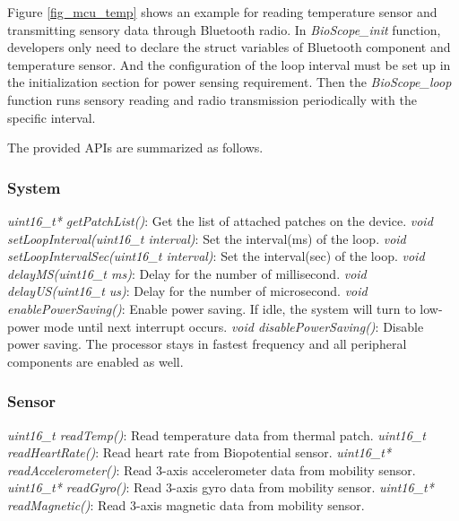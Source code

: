 Figure \ref{fig_mcu_temp} shows an example for reading temperature sensor and transmitting sensory data through Bluetooth radio.
In \textit{BioScope\_init} function, developers only need to declare the struct variables of Bluetooth component and temperature sensor. And the configuration of the loop interval must be set up in the initialization section for power sensing requirement.
Then the \textit{BioScope\_loop} function runs sensory reading and radio transmission periodically with the specific interval.

The provided APIs are summarized as follows.
\subsubsection{System}
\textit{uint16\_t* getPatchList()}: Get the list of attached patches on the device.
\vspace{10pt}
\newline
\textit{void setLoopInterval(uint16\_t interval)}: Set the interval(ms) of the loop.
\vspace{10pt}
\newline
\textit{void setLoopIntervalSec(uint16\_t interval)}: Set the interval(sec) of the loop.
\vspace{10pt}
\newline
\textit{void delayMS(uint16\_t ms)}: Delay for the number of millisecond.
\vspace{10pt}
\newline
\textit{void delayUS(uint16\_t us)}: Delay for the number of microsecond.
\vspace{10pt}
\newline
\textit{void enablePowerSaving()}: Enable power saving. If idle, the system will turn to low-power mode until next interrupt occurs.
\vspace{10pt}
\newline
\textit{void disablePowerSaving()}: Disable power saving. The processor stays in fastest frequency and all peripheral components are enabled as well.
\newline

\subsubsection{Sensor}
\textit{uint16\_t readTemp()}: Read temperature data from thermal patch.
\vspace{10pt}
\newline
\textit{uint16\_t readHeartRate()}: Read heart rate from Biopotential sensor.
\vspace{10pt}
\newline
\textit{uint16\_t* readAccelerometer()}: Read 3-axis accelerometer data from mobility sensor.
\vspace{10pt}
\newline
\textit{uint16\_t* readGyro()}: Read 3-axis gyro data from mobility sensor.
\vspace{10pt}
\newline
\textit{uint16\_t* readMagnetic()}: Read 3-axis magnetic data from mobility sensor.
\vspace{10pt}
\newline



